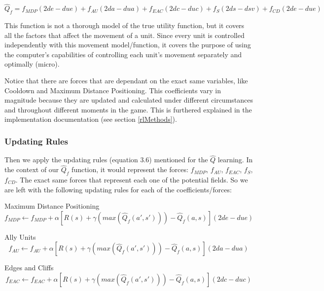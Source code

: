 \begin{equation}
\hat{Q}_f = f_{MDP} (2de - due) + f_{AU} (2da - dua) + f_{EAC} (2dc - duc) + f_{S}  (2ds - dsv) + f_{CD} (2de - due) 
\end{equation}

This function is not a thorough model of the true utility function, but it covers all the factors that affect the movement of a unit. Since every unit is controlled independently with this movement model/function, it covers the purpose of using the computer's capabilities of controlling each unit's movement separately and optimally (micro).

Notice that there are forces that are dependant on the exact same variables, like Cooldown and Maximum Distance Positioning. This coefficients vary in magnitude because they are updated and calculated under different circumstances and throughout different moments in the game. This is furthered explained in the implementation documentation (see section \ref{rlMethods}). 

\subsubsection{Updating Rules}

Then we apply the updating rules (equation 3.6) mentioned for the $\hat{Q}$ learning. In the context of our  $\hat{Q}_f$ function, it would represent the forces: $f_{MDP}$, $f_{AU}$, $f_{EAC}$, $f_{S}$, $f_{CD}$. The exact same forces that represent each one of the potential fields. So we are left with the following updating rules for each of the coefficients/forces:

\begin{flushleft}
Maximum Distance Positioning 
\begin{equation}
f_{MDP}  \leftarrow f_{MDP}  + \alpha [ R(s) + \gamma (max(\hat{Q}_{f} (a',s')))-\hat{Q}_{f} (a,s) ](2de - due)
\end{equation}
\end{flushleft} 

\begin{flushleft}
Ally Units
\begin{equation}
f_{AU}  \leftarrow f_{AU} + \alpha [ R(s) + \gamma (max(\hat{Q}_{f} (a',s')))-\hat{Q}_{f} (a,s) ](2da - dua)
\end{equation}
\end{flushleft} 

\begin{flushleft}
Edges and Cliffs
\begin{equation}
f_{EAC}  \leftarrow f_{EAC}  + \alpha [ R(s) + \gamma (max(\hat{Q}_{f} (a',s')))-\hat{Q}_{f} (a,s) ] (2dc - duc)
\end{equation}
\end{flushleft} 

